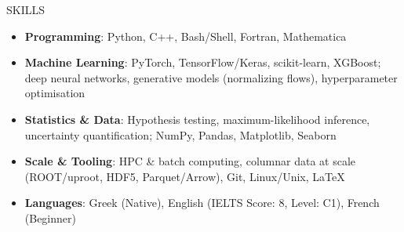 \documentclass{resume} %
\begin{document}



        
        \vspace{-0.5em}

        \begin{rSection}{SKILLS}
                \begin{itemize}
                        \itemsep -2pt {} 
                        \item \textbf{Programming}: Python, C++, Bash/Shell, Fortran, Mathematica
                        \item \textbf{Machine Learning}: PyTorch, TensorFlow/Keras, scikit-learn, XGBoost; deep neural networks, generative models (normalizing flows), hyperparameter optimisation
                        \item \textbf{Statistics \& Data}: Hypothesis testing, maximum-likelihood inference, uncertainty quantification; NumPy, Pandas, Matplotlib, Seaborn
                        \item \textbf{Scale \& Tooling}: HPC \& batch computing, columnar data at scale (ROOT/uproot, HDF5, Parquet/Arrow), Git, Linux/Unix, \LaTeX
                        \item \textbf{Languages}: Greek (Native), English (IELTS Score: 8, Level: C1), French (Beginner)
                \end{itemize}
        \end{rSection}
\end{document}
